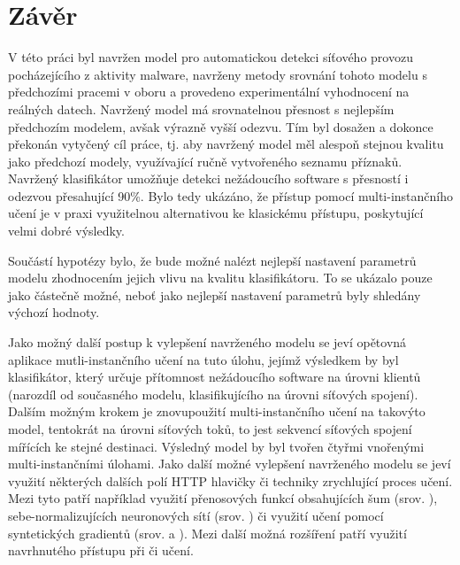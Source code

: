 \chapter*{Závěr}

V této práci byl navržen model pro automatickou detekci síťového provozu pocházejícího z aktivity malware, navrženy metody srovnání tohoto modelu s předchozími pracemi v oboru a provedeno experimentální vyhodnocení na reálných datech. Navržený model má srovnatelnou přesnost s nejlepším předchozím modelem, avšak výrazně vyšší odezvu. Tím byl dosažen a dokonce překonán vytyčený cíl práce, tj. aby navržený model měl alespoň stejnou kvalitu jako předchozí modely, využívající ručně vytvořeného seznamu příznaků. Navržený klasifikátor umožňuje detekci nežádoucího software s přesností i odezvou přesahující 90\%. Bylo tedy ukázáno, že přístup pomocí multi-instančního učení je v praxi využitelnou alternativou ke klasickému přístupu, poskytující velmi dobré výsledky.

Součástí hypotézy bylo, že bude možné nalézt nejlepší nastavení parametrů modelu zhodnocením jejich vlivu na kvalitu klasifikátoru. To se ukázalo pouze jako částečně možné, neboť jako nejlepší nastavení parametrů byly shledány výchozí hodnoty. 

Jako možný další postup k vylepšení navrženého modelu se jeví opětovná aplikace mutli-instančního učení na tuto úlohu, jejímž výsledkem by byl klasifikátor, který určuje přítomnost nežádoucího software na úrovni klientů (narozdíl od současného modelu, klasifikujícího na úrovni síťových spojení). Dalším možným krokem je znovupoužití multi-instančního učení na takovýto model, tentokrát na úrovni síťových toků, to jest sekvencí síťových spojení mířících ke stejné destinaci. Výsledný model by byl tvořen čtyřmi vnořenými multi-instančními úlohami. Jako další možné vylepšení navrženého modelu se jeví využití některých dalších polí HTTP hlavičky či techniky zrychlující proces učení. Mezi tyto patří například využití přenosových funkcí obsahujících šum (srov. \cite{gulcehre_noisy_2016}), sebe-normalizujících neuronových sítí (srov. \cite{klambauer_self-normalizing_2017}) či využití učení pomocí syntetických gradientů (srov. \cite{jaderberg_decoupled_2016} a \cite{czarnecki_understanding_2017}). Mezi další možná rozšíření patří využití navrhnutého přístupu při  či  učení.
